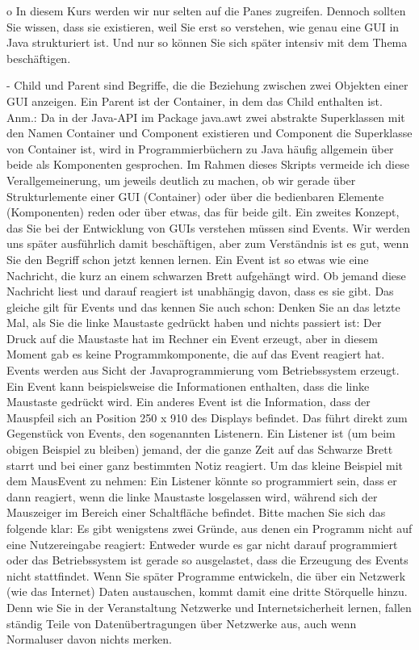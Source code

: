 o	In diesem Kurs werden wir nur selten auf die Panes zugreifen. Dennoch sollten Sie wissen, dass sie existieren, weil Sie erst so verstehen, wie genau eine GUI in Java strukturiert ist. Und nur so können Sie sich später intensiv mit dem Thema beschäftigen.

-	Child und Parent sind Begriffe, die die Beziehung zwischen zwei Objekten einer GUI anzeigen. Ein Parent ist der Container, in dem das Child enthalten ist.
Anm.: Da in der Java-API im Package java.awt zwei abstrakte Superklassen mit den Namen Container und Component existieren und Component die Superklasse von Container ist, wird in Programmierbüchern zu Java häufig allgemein über beide als Komponenten gesprochen. Im Rahmen dieses Skripts vermeide ich diese Verallgemeinerung, um jeweils deutlich zu machen, ob wir gerade über Strukturlemente einer GUI (Container) oder über die bedienbaren Elemente (Komponenten) reden oder über etwas, das für beide gilt.
Ein zweites Konzept, das Sie bei der Entwicklung von GUIs verstehen müssen sind Events. Wir werden uns später ausführlich damit beschäftigen, aber zum Verständnis ist es gut, wenn Sie den Begriff schon jetzt kennen lernen.
Ein Event ist so etwas wie eine Nachricht, die kurz an einem schwarzen Brett aufgehängt wird. Ob jemand diese Nachricht liest und darauf reagiert ist unabhängig davon, dass es sie gibt. Das gleiche gilt für Events und das kennen Sie auch schon: Denken Sie an das letzte Mal, als Sie die linke Maustaste gedrückt haben und nichts passiert ist: Der Druck auf die Maustaste hat im Rechner ein Event erzeugt, aber in diesem Moment gab es keine Programmkomponente, die auf das Event reagiert hat. Events werden aus Sicht der Javaprogrammierung vom Betriebssystem erzeugt.
Ein Event kann beispielsweise die Informationen enthalten, dass die linke Maustaste gedrückt wird. Ein anderes Event ist die Information, dass der Mauspfeil sich an Position 250 x 910 des Displays befindet.
Das führt direkt zum Gegenstück von Events, den sogenannten Listenern. Ein Listener ist (um beim obigen Beispiel zu bleiben) jemand, der die ganze Zeit auf das Schwarze Brett starrt und bei einer ganz bestimmten Notiz reagiert. Um das kleine Beispiel mit dem MausEvent zu nehmen: Ein Listener könnte so programmiert sein, dass er dann reagiert, wenn die linke Maustaste losgelassen wird, während sich der Mauszeiger im Bereich einer Schaltfläche befindet. 
Bitte machen Sie sich das folgende klar: Es gibt wenigstens zwei Gründe, aus denen ein Programm nicht auf eine Nutzereingabe reagiert: Entweder wurde es gar nicht darauf programmiert oder das Betriebssystem ist gerade so ausgelastet, dass die Erzeugung des Events nicht stattfindet. Wenn Sie später Programme entwickeln, die über ein Netzwerk (wie das Internet) Daten austauschen, kommt damit eine dritte Störquelle hinzu. Denn wie Sie in der Veranstaltung Netzwerke und Internetsicherheit lernen, fallen ständig Teile von Datenübertragungen über Netzwerke aus, auch wenn Normaluser davon nichts merken.
